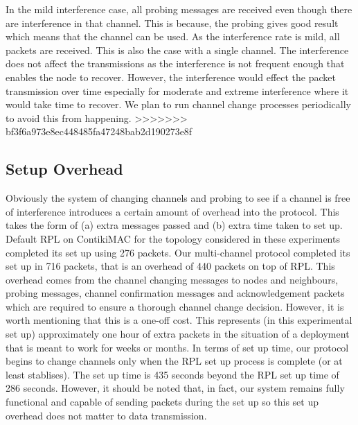 In the mild interference case, all probing messages are received even though there are interference in that channel. This is because, the probing gives good result which means that the channel can be used. As the interference rate is mild, all packets are received. This is also the case with a single channel. The interference does not affect the transmissions as the interference is not frequent enough that enables the node to recover. However, the interference would effect the packet transmission over time especially for moderate and extreme interference where it would take time to recover. We plan to run channel change processes periodically to avoid this from happening. %
>>>>>>> bf3f6a973e8ec448485fa47248bab2d190273e8f


\subsection{Setup Overhead}




Obviously the system of changing channels and probing to see if a channel is free of interference introduces a certain amount of overhead into
the protocol.  This takes the form of (a) extra messages passed and (b) extra time taken to set up.  Default RPL on ContikiMAC for the topology considered in these experiments completed its set up using 276 packets.  Our multi-channel protocol completed its set up in 716 packets, that is an overhead of 440 packets on top of RPL. 
This overhead comes from the channel changing messages to nodes and neighbours, probing messages, channel confirmation messages and acknowledgement packets which are required to ensure a thorough channel change decision.
However, it is worth mentioning that this is a one-off cost.  This represents (in this experimental set up) approximately one hour of extra packets in the situation of a deployment that is meant to work for weeks or months.  In terms of set up time, our protocol begins to change channels only when the RPL set up process is complete (or at least stablises).  The set up time is 435 seconds beyond the 
RPL set up time of 286 seconds.  However, it should be noted that, in fact, our system remains fully functional and capable of sending packets during
the set up so this set up overhead does not matter to data transmission.
